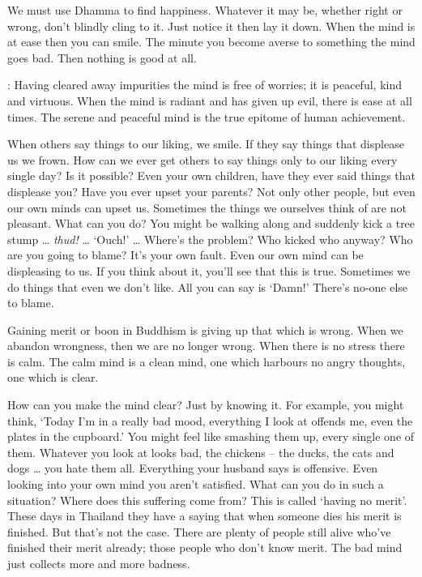 We must use Dhamma to find happiness. Whatever it may be, whether right or wrong, don't blindly cling to it. Just notice it then lay it down. When the mind is at ease then you can smile. The minute you become averse to something the mind goes bad. Then nothing is good at all. 

: Having cleared away impurities the mind is free of worries; it is peaceful, kind and virtuous. When the mind is radiant and has given up evil, there is ease at all times. The serene and peaceful mind is the true epitome of human achievement. 

When others say things to our liking, we smile. If they say things that displease us we frown. How can we ever get others to say things only to our liking every single day? Is it possible? Even your own children, have they ever said things that displease you? Have you ever upset your parents? Not only other people, but even our own minds can upset us. Sometimes the things we ourselves think of are not pleasant. What can you do? You might be walking along and suddenly kick a tree stump \ldots{} \textit{thud!} \ldots{} `Ouch!' \ldots{} Where's the problem? Who kicked who anyway? Who are you going to blame? It's your own fault. Even our own mind can be displeasing to us. If you think about it, you'll see that this is true. Sometimes we do things that even we don't like. All you can say is `Damn!' There's no-one else to blame. 

Gaining merit or boon in Buddhism is giving up that which is wrong. When we abandon wrongness, then we are no longer wrong. When there is no stress there is calm. The calm mind is a clean mind, one which harbours no angry thoughts, one which is clear. 

How can you make the mind clear? Just by knowing it. For example, you might think, `Today I'm in a really bad mood, everything I look at offends me, even the plates in the cupboard.' You might feel like smashing them up, every single one of them. Whatever you look at looks bad, the chickens -- the ducks, the cats and dogs \ldots{} you hate them all. Everything your husband says is offensive. Even looking into your own mind you aren't satisfied. What can you do in such a situation? Where does this suffering come from? This is called `having no merit'. These days in Thailand they have a saying that when someone dies his merit is finished. But that's not the case. There are plenty of people still alive who've finished their merit already; those people who don't know merit. The bad mind just collects more and more badness. 

